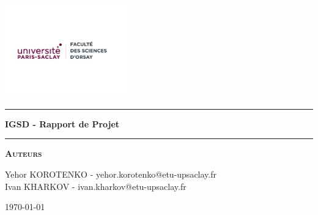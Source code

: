 \begin{titlepage}
\begin{center}
\vspace{2cm}
\includegraphics[width=0.4\textwidth]{saclay_sciences.png}~\\[1cm]
\vspace{2cm}

\hrule
\vspace{.5cm}
{ \huge \bfseries IGSD - Rapport de Projet} %
\vspace{.5cm}


\hrule
\vspace{1.5cm}

\textsc{\textbf{Auteurs}}\\
\vspace{.5cm}
\centering

Yehor KOROTENKO - yehor.korotenko@etu-upsaclay.fr\\
Ivan KHARKOV - ivan.kharkov@etu-upsaclay.fr\\

\vspace{4cm}

\centering \today %
\end{center}
\end{titlepage}
